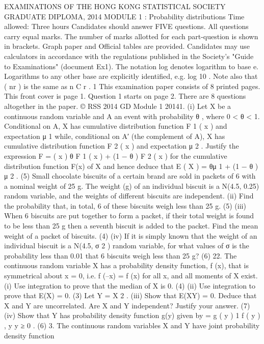 EXAMINATIONS OF THE HONG KONG STATISTICAL SOCIETY
GRADUATE DIPLOMA, 2014
MODULE 1 : Probability distributions
Time allowed: Three hours
Candidates should answer FIVE questions.
All questions carry equal marks.
The number of marks allotted for each part-question is shown in brackets.
Graph paper and Official tables are provided.
Candidates may use calculators in accordance with the regulations published in
the Society's "Guide to Examinations" (document Ex1).
The notation log denotes logarithm to base e.
Logarithms to any other base are explicitly identified, e.g. log 10 .
Note also that
( nr ) is the same as
n
C r .
1
This examination paper consists of 8 printed pages.
This front cover is page 1.
Question 1 starts on page 2.
There are 8 questions altogether in the paper.
© RSS 2014
GD Module 1 20141.
(i)
Let X be a continuous random variable and A an event with probability θ ,
where 0 < θ < 1. Conditional on A, X has cumulative distribution function
F 1 ( x ) and expectation μ 1 while, conditional on A′ (the complement of A), X
has cumulative distribution function F 2 ( x ) and expectation μ 2 . Justify the
expression
F =
( x ) θ F 1 ( x ) + (1 − θ ) F 2 ( x )
for the cumulative distribution function F(x) of X and hence deduce that
E ( X ) = θμ 1 + (1 − θ ) μ 2 .
(5)
Small chocolate biscuits of a certain brand are sold in packets of 6 with a nominal
weight of 25 g. The weight (g) of an individual biscuit is a N(4.5, 0.25) random
variable, and the weights of different biscuits are independent.
(ii)
Find the probability that, in total, 6 of these biscuits weigh less than 25 g.
(5)
(iii) When 6 biscuits are put together to form a packet, if their total weight is found
to be less than 25 g then a seventh biscuit is added to the packet. Find the mean
weight of a packet of biscuits.
(4)
(iv) If it is simply known that the weight of an individual biscuit is a N(4.5, σ 2 )
random variable, for what values of σ is the probability less than 0.01 that
6 biscuits weigh less than 25 g?
(6)
22.
The continuous random variable X has a probability density function, f (x), that is
symmetrical about x = 0, i.e. f (–x) = f (x) for all x, and all moments of X exist.
(i)
Use integration to prove that the median of X is 0.
(4)
(ii)
Use integration to prove that E(X) = 0.
(3)
Let Y = X 2 .
(iii) Show that E(XY) = 0. Deduce that X and Y are uncorrelated. Are X and Y
independent? Justify your answer.
(7)
(iv) Show that Y has probability density function g(y) given by
=
g ( y )
1
f ( y ) ,
y
y ≥ 0 .
(6)
3.
The continuous random variables X and Y have joint probability density function
